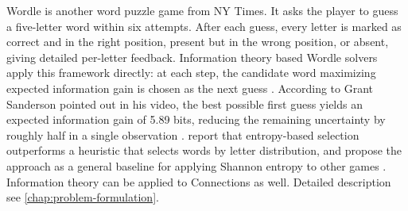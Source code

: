 Wordle is another word puzzle game from NY Times. It asks the player to guess a five-letter word within six attempts. After each guess, every letter is marked as correct and in the right position, present but in the wrong position, or absent, giving detailed per-letter feedback. Information theory based Wordle solvers apply this framework directly: at each step, the candidate word maximizing expected information gain is chosen as the next guess \cite{aladailehSolvingWordleUsing2026}. According to Grant Sanderson pointed out in his video, the best possible first guess yields an expected information gain of 5.89 bits, reducing the remaining uncertainty by roughly half in a single observation \cite{3blue1brownSolvingWordleUsing2022}. \citeauthor{aladailehSolvingWordleUsing2026} report that entropy-based selection outperforms a heuristic that selects words by letter distribution, and propose the approach as a general baseline for applying Shannon entropy to other games \cite{aladailehSolvingWordleUsing2026}.
Information theory can be applied to Connections as well. Detailed description see \autoref{chap:problem-formulation}.


